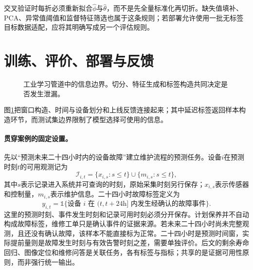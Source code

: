 交叉验证时每折必须重新拟合$\hat\phi$与$\hat\theta$，而不是先全量标准化再切折。缺失值填补、PCA、异常值阈值和监督特征筛选也属于这条规则；若部署允许使用一批无标签目标数据适配，应将其明确写成另一个评估规则。

\section{训练、评价、部署与反馈}
\begin{figure}[htbp]
\centering
{}
\caption{工业学习管道中的信息边界。切分、特征生成和标签构造共同决定是否发生泄漏。}
\label{fig:pipeline-information-boundary}
\end{figure}
图\ref{fig:pipeline-information-boundary}把窗口构造、时间与设备划分和上线反馈连接起来；其中延迟标签返回样本构造环节，而测试集边界限制了模型选择可使用的信息。
\paragraph{贯穿案例的固定设置。}
先以“预测未来二十四小时内的设备故障”建立维护流程的预测任务。设备$i$在预测时刻$t$的可用观测记为
\begin{equation}
 \mathcal{I}_{i,t}=\{x_{i,s}:s\leq t\}\cup\{m_{i,s}:s\leq t\},
\end{equation}
其中$s$表示记录进入系统并可查询的时刻，原始采集时刻另行保存；$x_{i,s}$表示传感器和控制量，$m_{i,s}$表示维护信息。二十四小时故障标签定义为
\begin{equation}
 y_{i,t}=\mathbb{1}\{\text{设备 }i\text{ 在 }(t,t+24\mathrm{h}]\text{ 内发生经确认的故障事件}\}.
\end{equation}
这里的预测时刻、事件发生时刻和记录可用时刻必须分开保存。计划保养并不自动构成故障标签，维修工单只是确认事件的证据来源。若未来二十四小时尚未完整观测，且还没有确认故障，该样本不能直接标为正常。二十四小时是预测时间窗，实际提前量则是故障发生时刻与有效告警时刻之差，需要单独评价。后文的剩余寿命回归、图像定位和维修问答是关联任务，各有标签与指标；共享的是证据可用性原则，而非强行统一输出。

